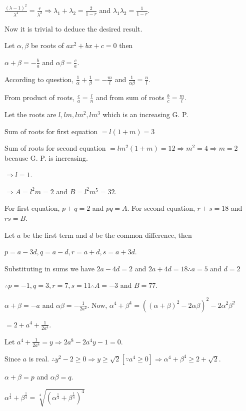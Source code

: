   $\frac{(\lambda - 1)^2}{\lambda^4} = \frac{r}{\lambda^2}\Rightarrow \lambda_1 + \lambda_2 = \frac{2}{1 -
    r}$ and $\lambda_1\lambda_2 = \frac{1}{1 - r}$.

  Now it is trivial to deduce the desired result.
\item Let $\alpha, \beta$ be roots of $ax^2 + bx + c = 0$ then

  $\alpha + \beta = -\frac{b}{a}$ and $\alpha\beta = \frac{c}{a}$.

  According to question, $\frac{1}{\alpha} + \frac{1}{\beta} = -\frac{m}{l}$ and $\frac{1}{\alpha\beta} =
  \frac{n}{l}$.

  From product of roots, $\frac{c}{a} = \frac{l}{n}$ and from sum of roots $\frac{b}{c} = \frac{m}{l}$.
\item Let the roots are $l, lm, lm^2, lm^3$ which is an increasing G. P.

  Sum of roots for first equation $= l(1 + m) = 3$

  Sum of roots for second equation $= lm^2(1 + m) = 12 \Rightarrow m^2 = 4 \Rightarrow m = 2$ because
  G. P. is increasing.

  $\Rightarrow l = 1$.

  $\Rightarrow A = l^2m = 2$ and $B = l^2m^5 = 32$.
\item For first equation, $p + q = 2$ and $pq = A.$ For second equation, $r + s = 18$ and $rs = B$.

  Let $a$ be the first term and $d$ be the common difference, then

  $p = a - 3d, q = a - d, r = a + d, s = a + 3d$.

  Substituting in sums we have $2a - 4d = 2$ and $2a + 4d = 18\therefore a = 5$ and $d = 2$

  $\therefore p = -1, q = 3, r = 7, s = 11\therefore A = -3$ and $B = 77$.
\item $\alpha + \beta = -a$ and $\alpha\beta = -\frac{1}{2a^2}$. Now, $\alpha^4 + \beta^4 = ((\alpha +
  \beta)^2 - 2\alpha\beta)^2 - 2\alpha^2\beta^2$

  $= 2 + a^4 + \frac{1}{2a^4}$.

  Let $a^4 + \frac{1}{2a^4} = y\Rightarrow 2a^8 - 2a^4y - 1 = 0$.

  Since $a$ is real. $\therefore y^2 - 2 \ge 0 \Rightarrow y \ge \sqrt{2} [\because a^4 \ge 0]\Rightarrow
  \alpha^4 + \beta^4 \ge 2 + \sqrt{2}$.
\item $\alpha + \beta = p$ and $\alpha\beta = q$.

  $\alpha^{\frac{1}{4}} + \beta^{\frac{1}{4}} = \sqrt[4]{\left(\alpha^{\frac{1}{4}} +
  \beta^{\frac{1}{4}}\right)^4}$

